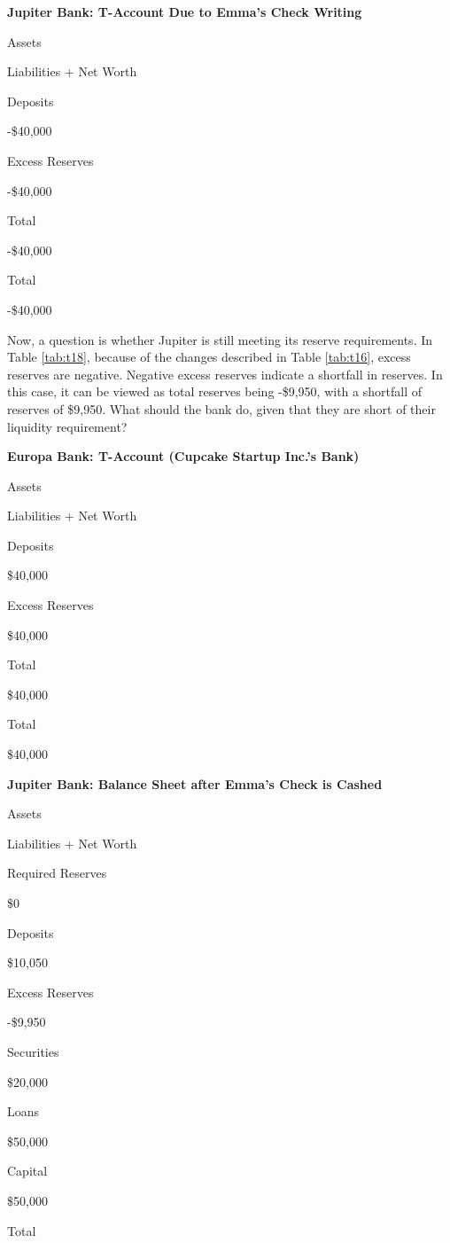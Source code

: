 \documentclass[
]{book}
\begin{document}
\label{tab:t16}\textbf{Jupiter Bank: T-Account Due to Emma's Check Writing}

Assets

Liabilities + Net Worth

Deposits

-\$40,000

Excess Reserves

-\$40,000

Total

-\$40,000

Total

-\$40,000

Now, a question is whether Jupiter is still meeting its reserve requirements. In Table \ref{tab:t18}, because of the changes described in Table \ref{tab:t16}, excess reserves are negative. Negative excess reserves indicate a shortfall in reserves. In this case, it can be viewed as total reserves being -\$9,950, with a shortfall of reserves of \$9,950. What should the bank do, given that they are short of their liquidity requirement?

\label{tab:t17}\textbf{Europa Bank: T-Account (Cupcake Startup Inc.'s Bank)}

Assets

Liabilities + Net Worth

Deposits

\$40,000

Excess Reserves

\$40,000

Total

\$40,000

Total

\$40,000

\label{tab:t18}\textbf{Jupiter Bank: Balance Sheet after Emma's Check is Cashed}

Assets

Liabilities + Net Worth

Required Reserves

\$0

Deposits

\$10,050

Excess Reserves

-\$9,950

Securities

\$20,000

Loans

\$50,000

Capital

\$50,000

Total
\end{document}
